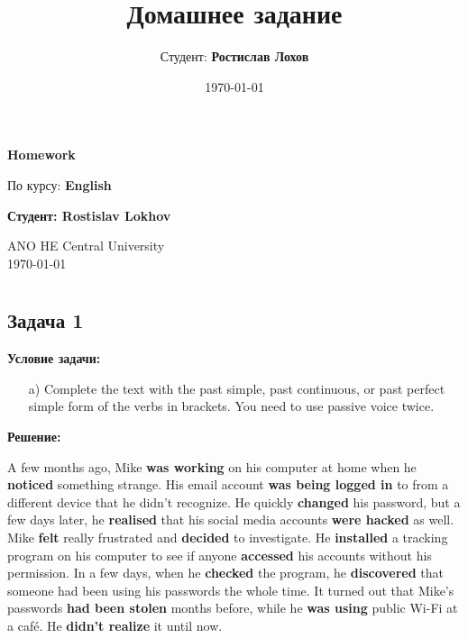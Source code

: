 \documentclass[a4paper,12pt]{article}
\title{Домашнее задание}
\author{Студент: \textbf{Ростислав Лохов}}
\date{\today}
\begin{document}
\begin{titlepage}
    \centering
    \vspace*{1cm}

    \Huge
    \textbf{Homework}

    \vspace{0.5cm}
    \LARGE
    По курсу: \textbf{English}

    \vspace{1.5cm}

    \textbf{Студент: Rostislav Lokhov}

    \vfill

    \Large
    ANO HE Central University\\
    \vspace{0.3cm}
    \today

\end{titlepage}

\tableofcontents
\newpage

\section{}

\subsection{Задача 1}
\textbf{Условие задачи:}

\begin{itemize}
    \item[a)] Complete the text with the past simple, past continuous, or past perfect simple form of the verbs in brackets. You need to use passive voice twice.
\end{itemize}

\textbf{Решение:}

A few months ago, Mike \textbf{was working} on his computer at home when he \textbf{noticed} something strange. His email account \textbf{was being logged in} to from a different device that he didn’t recognize. He quickly \textbf{changed} his password, but a few days later, he \textbf{realised} that his social media accounts \textbf{were hacked} as well. Mike \textbf{felt} really frustrated and \textbf{decided} to investigate. He \textbf{installed} a tracking program on his computer to see if anyone \textbf{accessed} his accounts without his permission. In a few days, when he \textbf{checked} the program, he \textbf{discovered} that someone had been using his passwords the whole time. It turned out that Mike’s passwords \textbf{had been stolen} months before, while he \textbf{was using} public Wi-Fi at a café. He \textbf{didn't realize} it until now.
\end{document}
